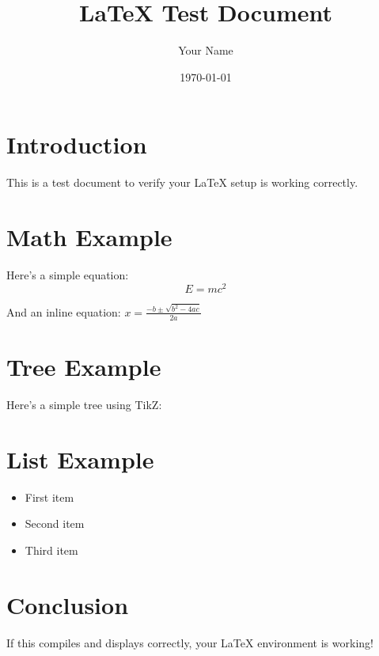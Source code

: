 \documentclass{article}
\title{LaTeX Test Document}
\author{Your Name}
\date{\today}
\begin{document}
\maketitle

\section{Introduction}
This is a test document to verify your LaTeX setup is working correctly.

\section{Math Example}
Here's a simple equation:
\begin{equation}
    E = mc^2
\end{equation}

And an inline equation: $x = \frac{-b \pm \sqrt{b^2 - 4ac}}{2a}$

\section{Tree Example}
Here's a simple tree using TikZ:


\section{List Example}
\begin{itemize}
    \item First item
    \item Second item
    \item Third item
\end{itemize}

\section{Conclusion}
If this compiles and displays correctly, your LaTeX environment is working!
\end{document}
